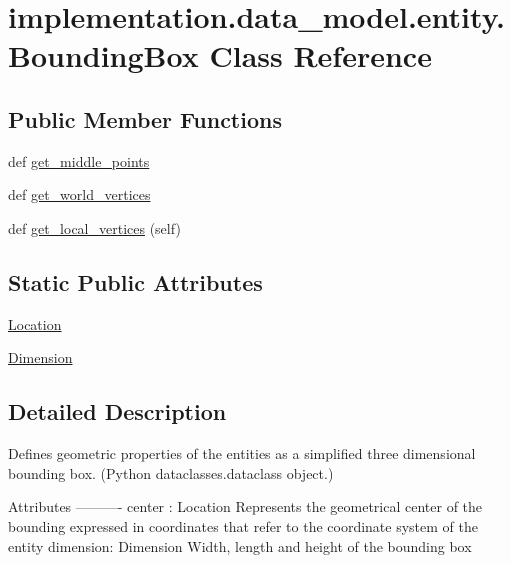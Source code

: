 \hypertarget{classimplementation_1_1data__model_1_1entity_1_1_bounding_box}{}\section{implementation.\+data\+\_\+model.\+entity.\+Bounding\+Box Class Reference}
\label{classimplementation_1_1data__model_1_1entity_1_1_bounding_box}
\subsection*{Public Member Functions}
\begin{DoxyCompactItemize}
\item 
def \hyperlink{classimplementation_1_1data__model_1_1entity_1_1_bounding_box_aee06e03485e4ca7770eff56e30856cf2}{get\+\_\+middle\+\_\+points}
\item 
def \hyperlink{classimplementation_1_1data__model_1_1entity_1_1_bounding_box_af113a1cd36b743c1aeaf4274cd07933a}{get\+\_\+world\+\_\+vertices}
\item 
def \hyperlink{classimplementation_1_1data__model_1_1entity_1_1_bounding_box_afc64d90d6cccc29866992de2d6fdb7d7}{get\+\_\+local\+\_\+vertices} (self)
\end{DoxyCompactItemize}
\subsection*{Static Public Attributes}
\begin{DoxyCompactItemize}
\item 
\hyperlink{classimplementation_1_1data__model_1_1entity_1_1_bounding_box_a77a1e731c9cfef373c286b0ba2da7706}{Location}
\item 
\hyperlink{classimplementation_1_1data__model_1_1entity_1_1_bounding_box_a2260283c12eb6a02a4d6684cb4c44333}{Dimension}
\end{DoxyCompactItemize}


\subsection{Detailed Description}
\begin{DoxyVerb}Defines geometric properties of the entities as a simplified three dimensional bounding box.
(Python dataclasses.dataclass object.)

Attributes
----------
center : Location
    Represents the geometrical center of the bounding expressed in coordinates that refer to the coordinate
    system of the entity
dimension: Dimension
    Width, length and height of the bounding box
\end{DoxyVerb}
 

